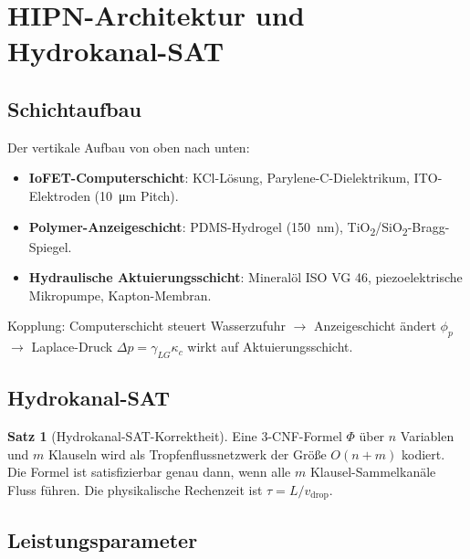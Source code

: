 ﻿\documentclass[a4paper,12pt]{scrreprt}
\theoremstyle{definition}
\newtheorem{satz}{Satz}[section]
\begin{document}
\section{HIPN-Architektur und Hydrokanal-SAT}

\subsection{Schichtaufbau}

Der vertikale Aufbau von oben nach unten:
\begin{itemize}
  \item \textbf{IoFET-Computerschicht}: KCl-Lösung, Parylene-C-Dielektrikum,
    ITO-Elektroden (\SI{10}{\micro m} Pitch).
  \item \textbf{Polymer-Anzeigeschicht}: PDMS-Hydrogel (\SI{150}{nm}),
    TiO\textsubscript{2}/SiO\textsubscript{2}-Bragg-Spiegel.
  \item \textbf{Hydraulische Aktuierungsschicht}: Mineralöl ISO VG 46,
    piezoelektrische Mikropumpe, Kapton-Membran.
\end{itemize}
Kopplung: Computerschicht steuert Wasserzufuhr $\to$ Anzeigeschicht
ändert $\phi_p$ $\to$ Laplace-Druck $\Delta p = \gamma_{LG}\kappa_c$
wirkt auf Aktuierungsschicht.

\subsection{Hydrokanal-SAT}

\begin{satz}[Hydrokanal-SAT-Korrektheit]
  Eine 3-CNF-Formel $\Phi$ über $n$ Variablen und $m$ Klauseln wird als
  Tropfenflussnetzwerk der Größe $O(n+m)$ kodiert. Die Formel ist
  satisfizierbar genau dann, wenn alle $m$ Klausel-Sammelkanäle Fluss
  führen. Die physikalische Rechenzeit ist $\tau = L/v_{\mathrm{drop}}$.
\end{satz}

\subsection{Leistungsparameter}
\end{document}
